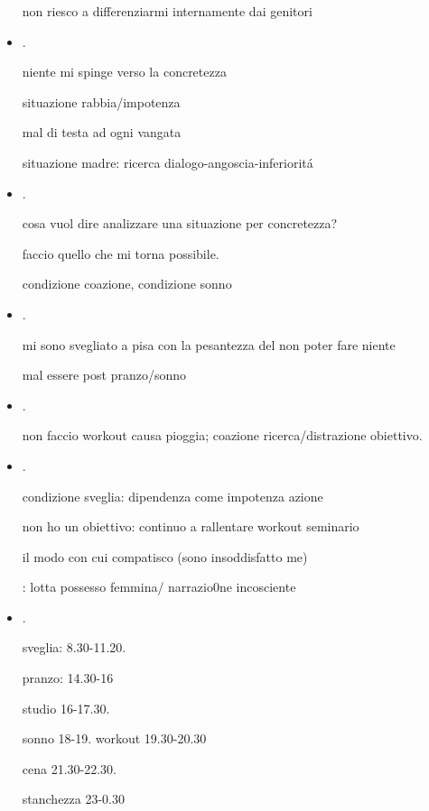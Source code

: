 \begin{itemize}
non riesco a differenziarmi internamente dai genitori

\item {}.

niente mi spinge verso la concretezza

situazione rabbia/impotenza

mal di testa ad ogni vangata

situazione madre: ricerca dialogo-angoscia-inferiorit\'a

\item {}.

cosa vuol dire analizzare una situazione per concretezza?

faccio quello che mi torna possibile.

condizione coazione, condizione sonno

\item {}.

mi sono svegliato a pisa con la pesantezza del non poter fare niente

mal essere post pranzo/sonno

\item {}.

non faccio workout causa pioggia; coazione ricerca/distrazione obiettivo.

\item {}.

condizione sveglia: dipendenza come impotenza azione

non ho un obiettivo: continuo a rallentare workout seminario

il modo con cui compatisco (sono insoddisfatto me)

: lotta possesso femmina/ narrazio0ne incosciente

\item {}.

sveglia: 8.30-11.20. 

pranzo: 14.30-16

studio 16-17.30.

sonno 18-19.
workout 19.30-20.30

cena 21.30-22.30.

stanchezza 23-0.30


\end{itemize}
